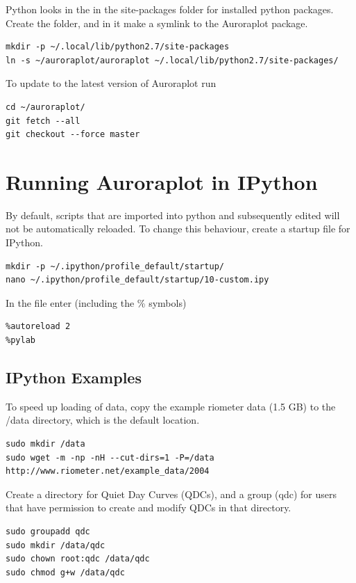 \documentclass{article}
\begin{document}
Python looks in the in the site-packages folder for installed python packages. Create the folder, and in it make a symlink to the Auroraplot package.
\begin{lstlisting}
mkdir -p ~/.local/lib/python2.7/site-packages
ln -s ~/auroraplot/auroraplot ~/.local/lib/python2.7/site-packages/
\end{lstlisting}

To update to the latest version of Auroraplot run
\begin{lstlisting}
cd ~/auroraplot/
git fetch --all
git checkout --force master
\end{lstlisting}


\section{Running Auroraplot in IPython}

By default, scripts that are imported into python and subsequently edited will not be automatically reloaded.
To change this behaviour, create a startup file for IPython.

\begin{lstlisting}
mkdir -p ~/.ipython/profile_default/startup/
nano ~/.ipython/profile_default/startup/10-custom.ipy
\end{lstlisting}

In the file enter (including the \% symbols)
\begin{lstlisting}[style=pythonstyle]
%load_ext autoreload
%autoreload 2
%pylab
\end{lstlisting}

\subsection{IPython Examples}

To speed up loading of data, copy the example riometer data (1.5 GB) to the /data directory, which is the default location.

\begin{lstlisting}
sudo mkdir /data
sudo wget -m -np -nH --cut-dirs=1 -P=/data http://www.riometer.net/example_data/2004
\end{lstlisting}

Create a directory for Quiet Day Curves (QDCs), and a group (qdc) for users that have permission to create and modify QDCs in that directory.

\begin{lstlisting}
sudo groupadd qdc
sudo mkdir /data/qdc
sudo chown root:qdc /data/qdc
sudo chmod g+w /data/qdc
\end{lstlisting}
\end{document}

